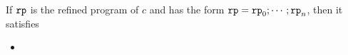 
\begin{lem}
  If $\mathtt{rp}$  is the refined program of $c$ and has the form $ \mathtt{rp} = \mathtt{rp}_0; \cdots; \mathtt{rp}_n$,
  then it satisfies
  \begin{itemize}
  \item 

\end{itemize}
\end{lem}

